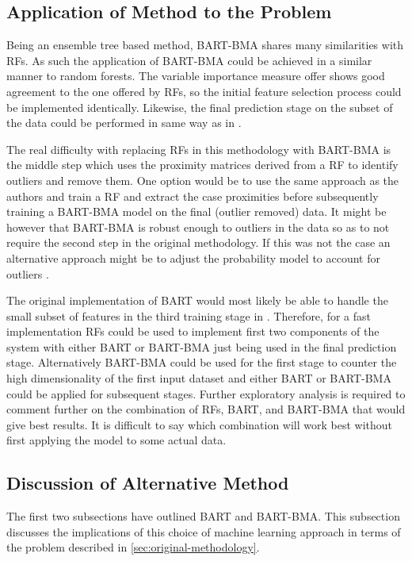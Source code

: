 \documentclass[journal]{IEEEtran}
\begin{document}
\subsection{Application of Method to the Problem}
Being an ensemble tree based method, BART-BMA shares many similarities with RFs. As such the application of BART-BMA could be achieved in a similar manner to random forests. The variable importance measure offer shows good agreement to the one offered by RFs, so the initial feature selection process could be implemented identically. Likewise, the final prediction stage on the subset of the data could be performed in same way as in \cite{riddick2011predicting}.

The real difficulty with replacing RFs in this methodology with BART-BMA is the middle step which uses the proximity matrices derived from a RF to identify outliers and remove them. One option would be to use the same approach as the authors and train a RF and extract the case proximities before subsequently training a BART-BMA model on the final (outlier removed) data. It might be however that BART-BMA is robust enough to outliers in the data so as to not require the second step in the original methodology. If this was not the case an alternative approach might be to adjust the probability model to account for outliers \cite{chipmanPresentation}.

The original implementation of BART would most likely be able to handle the small subset of features in the third training stage in \cite{riddick2011predicting}. Therefore, for a fast implementation RFs could be used to implement first two components of the system with either BART or BART-BMA just being used in the final prediction stage. Alternatively BART-BMA could be used for the first stage to counter the high dimensionality of the first input dataset and either BART or BART-BMA could be applied for subsequent stages. Further exploratory analysis is required to comment further on the combination of RFs, BART, and BART-BMA that would give best results. It is difficult to say which combination will work best without first applying the model to some actual data.

\subsection{Discussion of Alternative Method}
\label{subsec:discussion-alternate}
The first two subsections have outlined BART and BART-BMA. This subsection discusses the implications of this choice of machine learning approach in terms of the problem described in \ref{sec:original-methodology}. 
\end{document}
